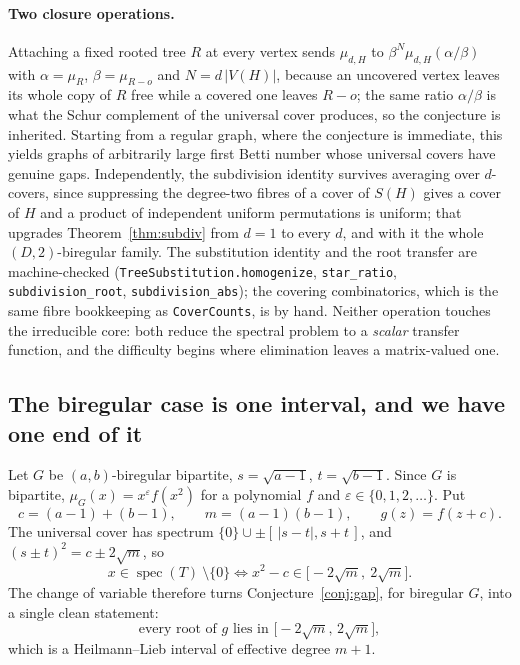 \documentclass[11pt]{article}
\theoremstyle{remark}
\begin{document}
\paragraph{Two closure operations.}
Attaching a fixed rooted tree $R$ at every vertex sends $\mu_{d,H}$ to
$\beta^{N}\mu_{d,H}(\alpha/\beta)$ with $\alpha=\mu_R$, $\beta=\mu_{R-o}$ and
$N=d\,|V(H)|$, because an uncovered vertex leaves its whole copy of $R$ free while a
covered one leaves $R-o$; the same ratio $\alpha/\beta$ is what the Schur complement of
the universal cover produces, so the conjecture is inherited. Starting from a regular
graph, where the conjecture is immediate, this yields graphs of arbitrarily large first
Betti number whose universal covers have genuine gaps. Independently, the subdivision
identity survives averaging over $d$-covers, since suppressing the degree-two fibres of a
cover of $S(H)$ gives a cover of $H$ and a product of independent uniform permutations is
uniform; that upgrades Theorem~\ref{thm:subdiv} from $d=1$ to every $d$, and with it the
whole $(D,2)$-biregular family. The substitution identity and the root transfer are
machine-checked (\texttt{TreeSubstitution.homogenize}, \texttt{star\_ratio},
\texttt{subdivision\_root}, \texttt{subdivision\_abs}); the covering combinatorics, which
is the same fibre bookkeeping as \texttt{CoverCounts}, is by hand. Neither operation
touches the irreducible core: both reduce the spectral problem to a \emph{scalar} transfer
function, and the difficulty begins where elimination leaves a matrix-valued one.

\subsection{The biregular case is one interval, and we have one end of it}
Let $G$ be $(a,b)$-biregular bipartite, $s=\sqrt{a-1}$, $t=\sqrt{b-1}$. Since
$G$ is bipartite, $\mu_G(x)=x^{\varepsilon}f(x^2)$ for a polynomial $f$ and
$\varepsilon\in\{0,1,2,\dots\}$. Put
\[
c=(a-1)+(b-1),\qquad m=(a-1)(b-1),\qquad g(z)=f(z+c).
\]
The universal cover has spectrum $\{0\}\cup\pm[\,|s-t|,s+t\,]$, and
$(s\pm t)^2=c\pm2\sqrt m$, so
\[
x\in\operatorname{spec}(T)\ \setminus\{0\}
\iff
x^2-c\in\bigl[-2\sqrt m,\ 2\sqrt m\bigr].
\]
The change of variable therefore turns Conjecture~\ref{conj:gap}, for biregular
$G$, into a single clean statement:
\begin{equation}\label{eq:twosided}
\text{every root of }g\text{ lies in }\bigl[-2\sqrt m,\,2\sqrt m\bigr],
\end{equation}
which is a Heilmann--Lieb interval of effective degree $m+1$.
\end{document}
